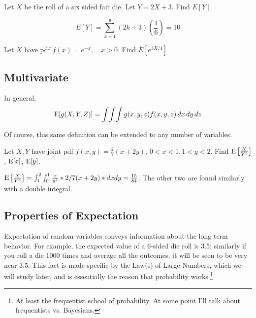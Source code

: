 \documentclass[../main.tex]{subfiles}
\begin{document}
\begin{example}
Let $X$ be the roll of a six sided fair die. Let $Y = 2X+3$. Find $E[Y]$
\end{example}
\begin{solution}
$$E[Y] = \sum_{k=1}^6 (2k+3)(\frac16) = 10$$
\end{solution}
\begin{example}
Let $X$ have pdf $f(x) = e^{-x}, \quad x>0$. Find $E[e^{3X/4}]$
\end{example}
\begin{solution}

\end{solution}
\subsection{Multivariate}
In general, $$\mathrm E[g(X,Y,Z)] = \int\!\int\!\int g(x,y,z) f(x,y,z) \,dx \,dy \,dz$$

Of course, this same definition can be extended to any number of variables. \begin{example}
    Let $X,Y$ have joint pdf $f(x,y) = \frac27 (x+2y)$, $0 < x < 1, 1<y<2$. Find $\mathrm E\left[\frac{X}{Y^3}\right]$, $\mathrm E[x]$, $\mathrm E[y]$. 
\end{example}
\begin{solution}
$\mathrm E\left[\frac{X}{Y^3}\right] = \int_{1}^{2}\int_{0}^{1}\frac{x}{y^3}*2/7(x+2y)*dxdy = \frac{15}{84}$. The other two are found similarly with a double integral. 
\end{solution}

\subsection{Properties of Expectation}
Expectation of random variables conveys information about the long term behavior. For example, the expected value of a 6-sided die roll is 3.5; similarly if you roll a die 1000 times and average all the outcomes, it will be seen to be very near 3.5. This fact is made specific by the Law(s) of Large Numbers, which we will study later, and is essentially the reason that probability works.\footnote{At 
least the frequentist school of probability. At some point I'll talk about frequentists vs. Bayesians.}
\end{document}
